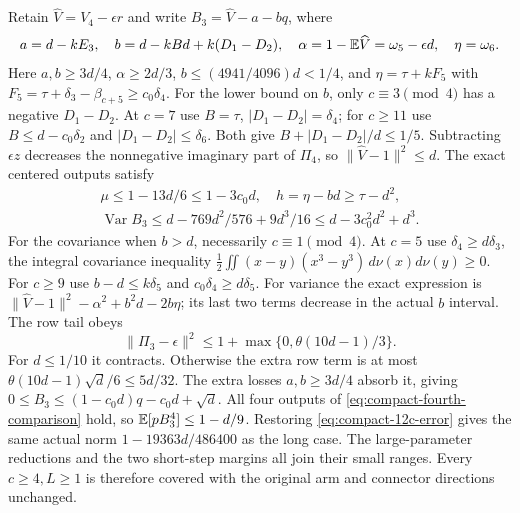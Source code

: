 Retain $\widehat V=V_4-\epsilon r$ and write $B_3=\widehat V-a-bq$, where
\begin{gather*}
 a=d-kE_3,\quad b=d-kBd+k(D_1-D_2),\quad
 \alpha=1-\mathbb E\widehat V=\omega_5-\epsilon d,\quad\eta=\omega_6.
\end{gather*}
Here $a,b\ge3d/4$, $\alpha\ge2d/3$,
$b\le(4941/4096)d<1/4$, and
$\eta=\tau+kF_5$ with $F_5=\tau+\delta_{3}-\beta_{c+5}\ge c_0\delta_{4}$.
For the lower bound on $b$, only $c\equiv3\pmod4$ has a negative
$D_1-D_2$. At $c=7$ use $B=\tau$, $|D_1-D_2|=\delta_{4}$;
for $c\ge11$ use $B\le d-c_0\delta_{2}$ and $|D_1-D_2|\le \delta_{6}$.
Both give $B+|D_1-D_2|/d\le1/5$.
Subtracting $\epsilon z$ decreases the nonnegative imaginary part of
$\Pi_4$, so $\|\widehat V-1\|^2\le d$.
The exact centered outputs satisfy
\begin{gather*}
 \mu\le1-13d/6\le1-3c_0d,\quad
 h=\eta-bd\ge\tau-d^2,\\
 \operatorname{Var}B_3\le d-769d^2/576+9d^3/16
                         \le d-3c_0^2d^2+d^3.
\end{gather*}
For the covariance when $b>d$, necessarily $c\equiv1\pmod4$.
At $c=5$ use $\delta_{4}\ge d\delta_{3}$, the integral covariance inequality
$\frac12\iint(x-y)(x^3-y^3)\,d\nu(x)d\nu(y)\ge0$.
For $c\ge9$ use $b-d\le k\delta_{5}$ and $c_0\delta_{4}\ge d\delta_{5}$.
For variance the exact expression is
$\|\widehat V-1\|^2-\alpha^2+b^2d-2b\eta$;
its last two terms decrease in the actual $b$ interval.
The row tail obeys
\[
 \|\Pi_3-\epsilon\|^2\le1+\max\{0,\theta(10d-1)/3\}.
\]
For $d\le1/10$ it contracts. Otherwise the extra row term is at most
$\theta(10d-1)\sqrt d/6\le5d/32$.
The extra losses $a,b\ge3d/4$ absorb it, giving
$0\le B_3\le(1-c_0d)q-c_0d+\sqrt d$.
All four outputs of \eqref{eq:compact-fourth-comparison} hold, so
$\mathbb E[pB_3^4]\le1-d/9$.
Restoring \eqref{eq:compact-12c-error} gives the same actual norm
$1-19363d/486400$ as the long case.
The large-parameter reductions and the two short-step margins all join
their small ranges. Every $c\ge4,L\ge1$ is therefore covered with the
original arm and connector directions unchanged.

